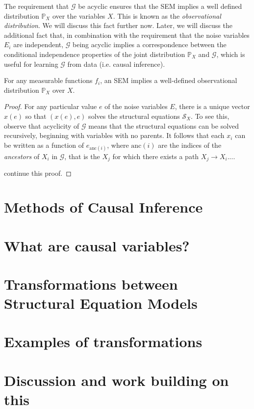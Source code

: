 The requirement that $\mathcal{G}$ be acyclic ensures that the SEM implies a well defined distribution $\mathbb{P}_X$ over the variables $X$. This is known as the \emph{observational distribution}. We will discuss this fact further now. Later, we will discuss the additional fact that, in combination with the requirement that the noise variables $E_i$ are independent, $\mathcal{G}$ being acyclic implies a correspondence between the conditional independence properties of the joint distribution $\mathbb{P}_X$ and $\mathcal{G}$, which is useful for learning $\mathcal{G}$ from data (i.e. causal inference). 

\begin{lemma}
For any measurable functions $f_i$, an SEM implies a well-defined observational distribution $\mathbb{P}_X$ over $X$.
\end{lemma}
\begin{proof}
For any particular value $e$ of the noise variables $E$, there is a unique vector $x(e)$ so that $(x(e), e)$ solves the structural equations $\mathcal{S}_X$. To see this, observe that acyclicity of $\mathcal{G}$ means that the structural equations can be solved recursively, beginning with variables with no parents. It follows that each $x_i$ can be written as a function of $e_{\text{anc}(i)}$, where $\text{anc}(i)$ are the indices of the \emph{ancestors} of $X_i$ in $\mathcal{G}$, that is the $X_j$ for which there exists a path $X_j \to X_i$....

continue this proof.
\end{proof}




\section{Methods of Causal Inference}
\section{What are causal variables?}
\section{Transformations between Structural Equation Models}
\section{Examples of transformations}
\section{Discussion and work building on this}










































